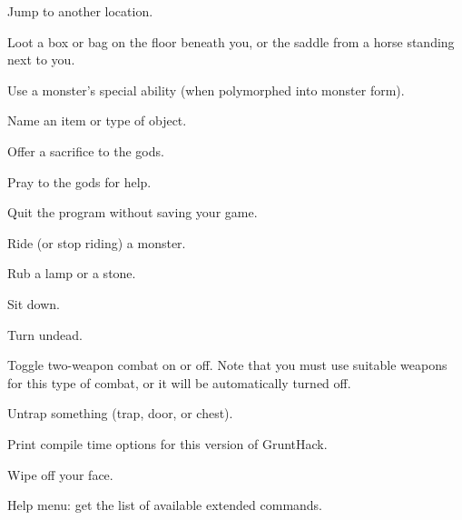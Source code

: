 Jump to another location.
\item[\tb{\#loot}]
Loot a box or bag on the floor beneath you, or the saddle 
from a horse standing next to you.
\item[\tb{\#monster}]
Use a monster's special ability (when polymorphed into monster form).
\item[\tb{\#name}]
Name an item or type of object.
\item[\tb{\#offer}]
Offer a sacrifice to the gods.
\item[\tb{\#pray}]
Pray to the gods for help.
\item[\tb{\#quit}]
Quit the program without saving your game.
\item[\tb{\#ride}]
Ride (or stop riding) a monster.
\item[\tb{\#rub}]
Rub a lamp or a stone.
\item[\tb{\#sit}]
Sit down.
\item[\tb{\#turn}]
Turn undead.
\item[\tb{\#twoweapon}]
Toggle two-weapon combat on or off.  Note that you must
use suitable weapons for this type of combat, or it will
be automatically turned off.
\item[\tb{\#untrap}]
Untrap something (trap, door, or chest).
\item[\tb{\#version}]
Print compile time options for this version of GruntHack.
\item[\tb{\#wipe}]
Wipe off your face.
\item[\tb{\#?}]
Help menu:  get the list of available extended commands.

